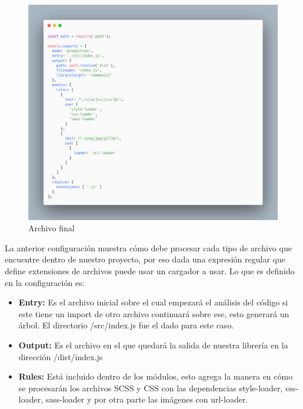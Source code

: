     \newline
    \newline
     \begin{figure}[H]
    \includegraphics[width=1\textwidth]{./Imagenes/image2.png}
     \caption[Archivo final]{Archivo final}
         \end{figure}
    \newline
    La anterior configuración muestra cómo debe procesar cada tipo de archivo que encuentre dentro de nuestro proyecto, por eso dada una expresión regular que define extensiones de archivos puede usar un cargador a usar.
    Lo que es definido en la configuración es:
    \begin{itemize}
    \item \textbf{Entry: } Es el archivo inicial sobre el cual empezará el análisis del código si este tiene un import de otro archivo continuará sobre ese, esto generará un árbol. El directorio /src/index.js fue el dado para este caso.
    \item \textbf{Output: } Es el archivo en el que quedará la salida de nuestra librería en la dirección /dist/index.js
    \item \textbf{Rules: }Está incluido dentro de los módulos, esto agrega la manera en cómo se procesarán los archivos SCSS y CSS  con las dependencias style-loader, css-loader, sass-loader y por otra parte las imágenes con url-loader.
    \end{itemize}
    
    
